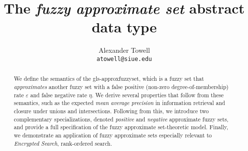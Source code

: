 \documentclass[10pt,journal,compsoc,hidelinks]{article}
\title
{
    The \emph{fuzzy approximate set} abstract data type
}
\author
{
    Alexander Towell\\
    \texttt{atowell@siue.edu}
}
\date{}
\theoremstyle{plain}
\begin{document}
\maketitle
\begin{abstract}
We define the semantics of the \gls*{gls-approxfuzzyset}, which is a fuzzy set that \emph{approximates} another fuzzy set with a false positive (non-zero degree-of-membership) rate $\varepsilon$ and false negative rate $\eta$. We derive several properties that follow from these semantics, such as the expected \emph{mean average precision} in information retrieval and closure under unions and intersections. Following from this, we introduce two complementary specializations, denoted \emph{positive} and \emph{negative} approximate fuzzy sets, and provide a full specification of the fuzzy approximate set-theoretic model. Finally, we demonstrate an application of fuzzy approximate sets especially relevant to \emph{Encrypted Search}, rank-ordered search.
\end{abstract}

\tableofcontents

\listoffigures
\listofalgorithms






\printglossary

\end{document}
